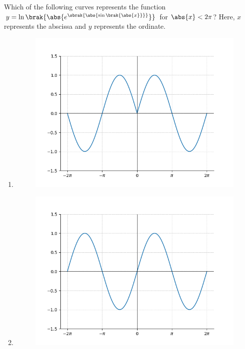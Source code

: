     \item \label{10} Which of the following curves represents the function $y = \ln\brak{\abs{e^{\sbrak{\abs{\sin \brak{\abs{x}}}}}}}$ for $\abs{x} < 2\pi$? Here, $x$ represents the abscissa and $y$ represents the ordinate.
        \begin{multicols}{2}
        \begin{enumerate}
            \item 
            \begin{figure}[H]
                \centering
                \includegraphics[width = 1\linewidth]{Gate-yearwise/AI24BTECH11015/figs/10a.png}
                \caption{}
            \end{figure}
            \item 
            \begin{figure}[H]
                \centering
                \includegraphics[width = 1\linewidth]{Gate-yearwise/AI24BTECH11015/figs/10b.png}

\end{figure}
\end{enumerate}
\end{multicols}
